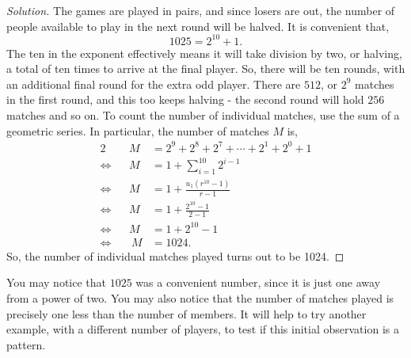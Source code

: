 \documentclass{article}
\begin{document}
\begin{proof}[Solution]
    The games are played in pairs, and since losers are out, the number of people available to play in the next round will be halved. It is convenient that, 
    \begin{equation*}
        1025=2^{10}+1.
    \end{equation*}
    The ten in the exponent effectively means it will take division by two, or halving, a total of ten times to arrive at the final player. So, there will be ten rounds, with an additional final round for the extra odd player. There are $512$, or $2^9$ matches in the first round, and this too keeps halving - the second round will hold $256$ matches and so on. To count the number of individual matches, use the sum of a geometric series. In particular, the number of matches $M$ is,
    \begin{alignat*}{2}
        && M &= 2^9+2^8+2^7+\cdots+2^1+2^0+1 \\
        \Leftrightarrow&& M &= 1 + \sum_{i=1}^{10} 2^{i-1} \\
        \Leftrightarrow&& M &= 1 + \frac{u_1\left(r^{10}-1\right)}{r-1} \\
        \Leftrightarrow&& M &= 1 + \frac{2^{10}-1}{2-1} \\
        \Leftrightarrow&& M &= 1 + 2^{10} -1 \\
        \Leftrightarrow&&\ M &= 1024.
    \end{alignat*}
    So, the number of individual matches played turns out to be 1024.
\end{proof}

You may notice that  $1025$ was a convenient number, since it is just one away from a power of two. You may also notice that the number of matches played is precisely one less than the number of members. It will help to try another example, with a different number of players, to test if this initial observation is a pattern.
\end{document}
